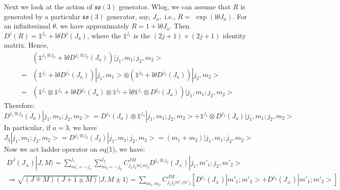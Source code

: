 \documentclass{article}
\begin{document}
	Next we look at the action of $\mathfrak{so}( 3)$ generator. Wlog, we can assume that $R$ is generated by a particular $\mathfrak{so} (3)$ generator, say, $J_{a} ,$ i.e., $R=$ $\exp(\mathbb{i} \theta J_{a})$. For an infinitesimal $\theta $, we have approximately $R=1+\mathbb{i} \theta J_{a}$. Then $D^{j} (R)=\mathbb{1}^{j_{1}} +\mathbb{i} \theta D^{j}( J_{a})$, where the $\mathbb{1}^{j_{1}}$ is the $(2j+1)\times (2j+1)$ identity matrix. Hence,
	\begin{equation*}
		\begin{aligned}
			& \left(\mathbb{1}^{j_{1} \otimes j_{2}} +\mathbb{i} \theta D^{j_{1} \otimes j_{2}}( J_{a})\right)| j_{1} ,m_{1} ;j_{2} ,m_{2}> \\
			= & \left(\mathbb{1}^{j_{1}} +\mathbb{i} \theta D^{j_{1}}( J_{a})\right)| j_{1} ,m_{1}> \otimes \left(\mathbb{1}^{j_{2}} +\mathbb{i} \theta D^{j_{2}}( J_{a})\right)| j_{2} ,m_{2}> \\
			= & \left(\mathbb{1}^{j_{1}} \otimes \mathbb{1}^{j_{2}} +\mathbb{i} \theta D^{j_{1}}( J_{a}) \otimes \mathbb{1}^{j_{2}} +\mathbb{i} \theta \mathbb{1}^{j_{1}} \otimes D^{j_{2}}( J_{a})\right)| j_{1} ,m_{1} ;j_{2} ,m_{2}> 
		\end{aligned}
	\end{equation*}
	Therefore:
	\begin{equation}
		D^{j_{1} \otimes j_{2}}( J_{a})| j_{1} ,m_{1} ;j_{2} ,m_{2}> =D^{j_{1}}( J_{a}) \otimes \mathbb{1}^{j_{2}}| j_{1} ,m_{1} ;j_{2} ,m_{2}> +\mathbb{1}^{j_{1}} \otimes D^{j_{2}}( J_{a})| j_{1} ,m_{1} ;j_{2} ,m_{2}> 
	\end{equation}
	In particular, if $a=3$, we have
	\begin{equation*}
		J_{3}| j_{1} ,m_{1} ;j_{2} ,m_{2}> =D^{j_{1} \otimes j_{2}}( J_{3})| j_{1} ,m_{1} ;j_{2} ,m_{2}> =( m_{1} +m_{2})| j_{1} ,m_{1} ;j_{2} ,m_{2}> 
	\end{equation*}
	Now we act ladder operator on eq(1), we have:
	\begin{equation*}
		\begin{array}{ c }
			D^{J}( J_{\pm }) |J,M\rangle ={\displaystyle \sum\limits _{m_{1}^{\prime } =-j_{1}}^{j_{1}}\sum\limits _{m_{2}^{\prime } =-j_{2}}^{j_{2}}} C_{j_{1} j_{2} m_{1}^{\prime } m_{2}^{\prime }}^{JM} D^{j_{1} \otimes j_{2}}( J_{\pm })| j_{1} ,m'_{1} ;j_{2} ,m'_{2}> \\
			\Longrightarrow \sqrt{(J\mp M)(J+1\pm M)} |J,M\pm 1\rangle ={\displaystyle \sum\limits _{m_{1} ,m_{2}}} C_{j_{1} j_{2} m'_{1} m'_{2}}^{JM}\left[ D^{j_{1}}( J_{\pm })| m'_{1} ;m'_{2}> +D^{j_{2}}( J_{\pm })| m'_{1} ;m'_{2}> \right]
		\end{array}
	\end{equation*}
\end{document}
